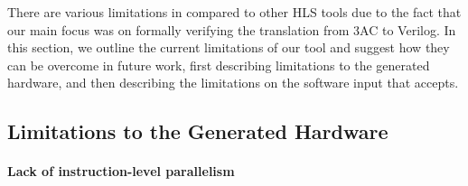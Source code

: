 There are various limitations in \vericert{} compared to other HLS tools due to the fact that our main focus was on formally verifying the translation from 3AC to Verilog. In this section, we outline the current limitations of our tool and suggest how they can be overcome in future work, first describing limitations to the generated hardware, and then describing the limitations on the software input that \vericert{} accepts.


\subsection{Limitations to the Generated Hardware}


\paragraph{Lack of instruction-level parallelism}

